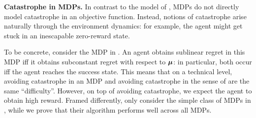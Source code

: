 \textbf{Catastrophe in MDPs.} In contrast to the model of \citet{plaut_avoiding_2024}, MDPs do not directly model catastrophe in an objective function. Instead, notions of catastrophe arise naturally through the environment dynamics: for example, the agent might get stuck in an inescapable zero-reward state.



To be concrete, consider the MDP in . An agent obtains sublinear regret in this MDP iff it obtains subconstant regret with respect to $\boldsymbol{\mu}$: in particular, both occur iff the agent reaches the success state. This means that on a technical level, avoiding catastrophe in an MDP and avoiding catastrophe in the sense of \citet{plaut_avoiding_2024} are the same ``difficulty''. However, on top of avoiding catastrophe, we expect the agent to obtain high reward. Framed differently,  \citet{plaut_avoiding_2024} only consider the simple class of MDPs in , while we prove that their algorithm performs well across all MDPs.
